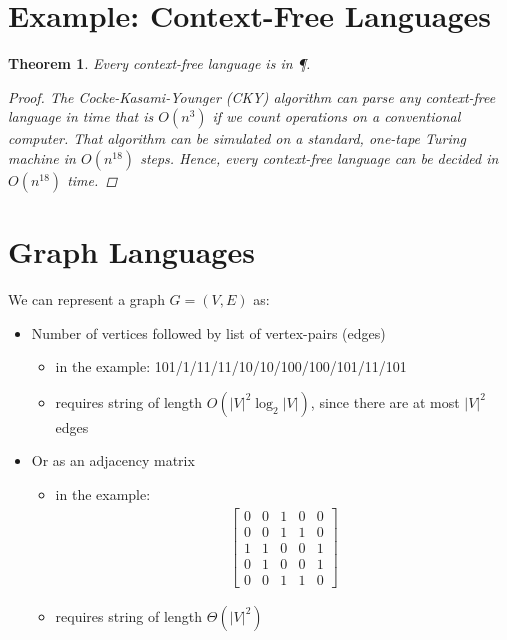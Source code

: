 \documentclass[a4paper]{report}
\newtheorem{theo}{Theorem}
\newcommand{\bookref}[3]{\marginpar{\faBook{}~#1\\Chapter #2\\Section #3}}
\theoremstyle{definition}
\begin{document}
\section{Example: Context-Free Languages}
\bookref{ER}{28}{28.1.3}
\begin{theo}
Every context-free language is in \P.
\begin{proof}
The Cocke-Kasami-Younger (CKY) algorithm can parse any context-free language in time that is $O(n^3)$ if we count operations on a conventional computer.  That algorithm can be simulated on a standard, one-tape Turing machine in $O(n^{18})$ steps. Hence, every context-free language can be decided in $O(n^{18})$ time.
\end{proof}
\end{theo}

\section{Graph Languages}
\begin{center}
%

\end{center}

We can represent a graph $G=(V,E)$ as:

\begin{itemize}
\item Number of vertices followed by list of vertex-pairs (edges)
\begin{itemize}
\item in the example: 101/1/11/11/10/10/100/100/101/11/101
\item requires string of length $O(|V|^2 \log_2 |V|)$, since there are at most $|V|^2$ edges
\end{itemize}
\item Or as an adjacency matrix
\begin{itemize}
\item in the example:
\begin{align*}
\begin{bmatrix} 
0 & 0 & 1 & 0 & 0 \\
0 & 0 & 1 & 1 & 0 \\
1 & 1 & 0 & 0 & 1 \\
0 & 1 & 0 & 0 & 1 \\
0 & 0 & 1 & 1 & 0
\end{bmatrix}
\end{align*}
\item requires string of length $\Theta(|V|^2)$
\end{itemize}
\end{itemize}
\end{document}
